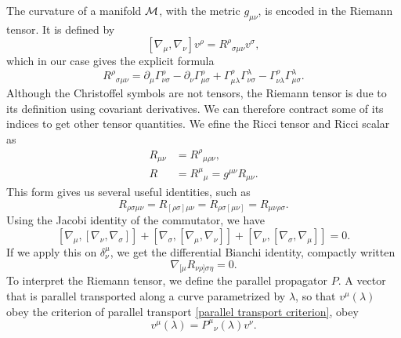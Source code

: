 The curvature of a manifold $\mathcal{M}$, with the metric $g_{\mu \nu}$, is encoded in the Riemann tensor.
It is defined by
%
\begin{equation}
    \label{Riemann tensor}
    [\nabla_\mu, \nabla_\nu] v^\rho = R^{\rho}{}_{\sigma \mu \nu} v^\sigma,
\end{equation}
%
which in our case gives the explicit formula
%
\begin{equation}
    \label{riemann tensor in terms of christoffel symbols}
    R^\rho{}_{\sigma \mu \nu} 
    = \partial_{\mu} \Gamma^{\rho}_{\nu \sigma}
    - \partial_{\nu} \Gamma^{\rho}_{\mu \sigma}
    + \Gamma^{\rho}_{\mu \lambda} \Gamma^{\lambda}_{\nu \sigma}  
    - \Gamma^{\rho}_{\nu \lambda} \Gamma^{\lambda}_{\mu \sigma}.
\end{equation}
%
Although the Christoffel symbols are not tensors, the Riemann tensor is due to its definition using covariant derivatives.
We can therefore contract some of its indices to get other tensor quantities.
We  efine the Ricci tensor and Ricci scalar as
%
\begin{align}
    \label{Ricci tensor}
    R_{\mu \nu} &= R^{\rho}{}_{\mu \rho \nu}, \\
    \label{Ricci scalar}
    R &= R^{\mu}{}_{\mu} = g^{\mu \nu} R_{\mu \nu}.
\end{align}
%
This form gives us several useful identities, such as
%
\begin{equation}
    R_{\rho \sigma \mu \nu} 
    = 
    R_{[\rho \sigma] \mu \nu}
    =
    R_{\rho \sigma [\mu \nu]}
    =
    R_{\mu \nu \rho \sigma }.
\end{equation}
%
Using the Jacobi identity of the commutator, we have
%
\begin{equation}
    \label{Jacobi identity differential geometry}
    [\nabla_\mu, [\nabla_\nu, \nabla_\sigma]]
    + [\nabla_\sigma, [\nabla_\mu, \nabla_\nu]]
    + [\nabla_\nu, [\nabla_\sigma, \nabla_\mu]] = 0.
\end{equation}
%
If we apply this on $\delta^{\mu}_{\nu}$, we get the differential Bianchi identity, compactly written
%
\begin{equation}
    \label{Binachi identiy}
    \nabla_{[\mu}R_{\nu \rho]\sigma \eta} = 0.
\end{equation}
%
To interpret the Riemann tensor, we define the parallel propagator $P$.
A vector that is parallel transported along a curve parametrized by $\lambda$, so that $v^\mu(\lambda)$ obey the criterion of parallel transport \autoref{parallel transport criterion}, obey
%
\begin{equation}
    v^\mu(\lambda) = P^\mu{}_\nu(\lambda) v^\nu.
\end{equation}
